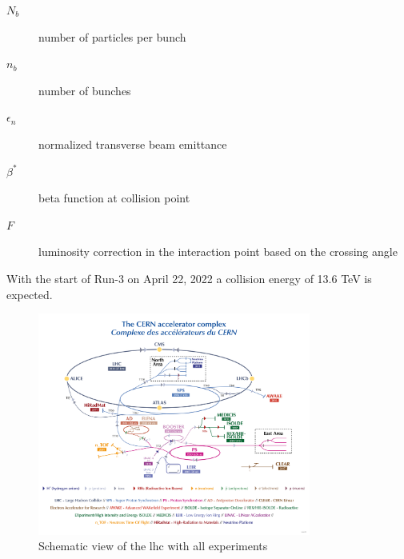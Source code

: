 \documentclass[../Bachelorarbeit.tex]{subfiles}
\begin{document}
\begin{description}
    \item[$N_{b}$] number of particles per bunch
    \item[$n_{b}$]  number of bunches
    \item[$\epsilon_{n}$]  normalized transverse beam emittance
    \item[$\beta^{*}$] beta function at collision point
    \item[$F$] luminosity correction in the interaction point based on the crossing angle
\end{description}
With the start of Run-3 on April 22, 2022 a collision energy of 13.6 TeV is expected.
\begin{figure}
    \centering
    \includegraphics[width=0.8\textwidth]{images/CCC-v2022.jpg}
    \caption{Schematic view of the \acrshort{lhc} with all experiments \cite{CERN.01.05.2022}}
    \label{fig:LHC_schematic}
\end{figure}
\end{document}
